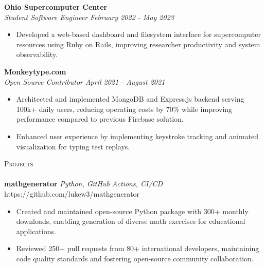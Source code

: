 \documentclass[letterpaper]{article}
\newcommand{\lineunder} {
    \vspace*{-8pt} \\
    \hspace*{-18pt} \hrulefill \\
}
\newcommand{\header} [1] {
    {\hspace*{-18pt}\vspace*{6pt} \textsc{#1}}
    \vspace*{-6pt} \lineunder
}
\begin{document}
    \textbf{Ohio Supercomputer Center}\\
    
    \textit{Student Software Engineer} \hfill \textsl{February 2022 - May 2023}\\
    \vspace{-7pt}
    \begin{itemize} \itemsep -1mm
        
            \item Developed a web-based dashboard and filesystem interface for supercomputer resources using Ruby on Rails, improving researcher productivity and system observability.

    \end{itemize}
    \vspace{-2mm}

    	\textbf{Monkeytype.com}\\
    
    \textit{Open Source Contributor} \hfill \textsl{April 2021 - August 2021}\\
    \vspace{-7pt}
    \begin{itemize} \itemsep -1mm
            \item Architected and implemented MongoDB and Express.js backend serving 100k+ daily users, reducing operating costs by 70\% while improving performance compared to previous Firebase solution.

            \item Enhanced user experience by implementing keystroke tracking and animated visualization for typing test replays.

    \end{itemize}
    \vspace{-2mm}

\header{Projects}

    {\textbf{mathgenerator}} {\sl Python, GitHub Actions, CI/CD} \hfill https://github.com/lukew3/mathgenerator\\
    \vspace{-2mm}
    \begin{itemize} \itemsep -1mm
    
        \item Created and maintained open-source Python package with 300+ monthly downloads, enabling generation of diverse math exercises for educational applications.

        \item Reviewed 250+ pull requests from 80+ international developers, maintaining code quality standards and fostering open-source community collaboration.

    \end{itemize}
    \vspace{-2mm}
\end{document}
